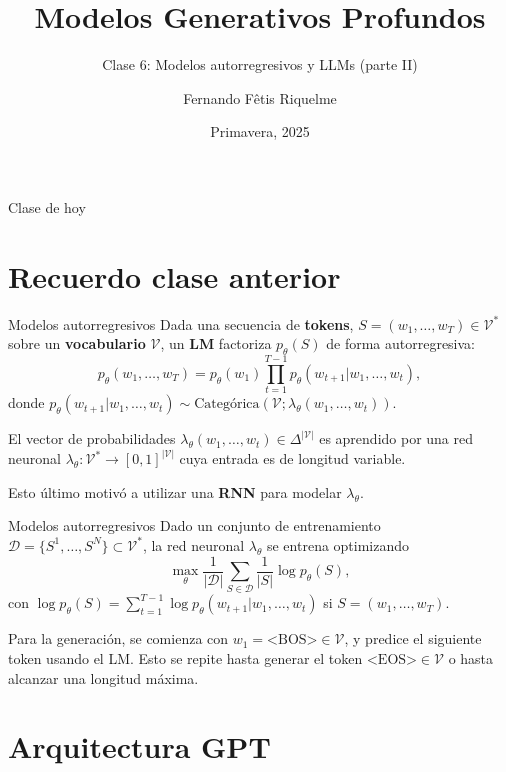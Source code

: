 \documentclass{beamer}
\title{Modelos Generativos Profundos}
\subtitle{Clase 6: Modelos autorregresivos y LLMs (parte II)}
\author{Fernando Fêtis Riquelme}
\institute{
    Facultad de Ciencias Físicas y Matemáticas\\
    Universidad de Chile
}
\date{Primavera, 2025}
\begin{document}
\begin{frame}
    \titlepage
\end{frame}

\begin{frame}{Clase de hoy}
    \tableofcontents
\end{frame}

\section{Recuerdo clase anterior}

\begin{frame}{Modelos autorregresivos}
    Dada una secuencia de \textbf{tokens}, $S=(w_1,\ldots,w_T)\in\mathcal{V}^*$ sobre un \textbf{vocabulario} $\mathcal{V}$, un \textbf{LM} factoriza $p_\theta(S)$ de forma autorregresiva:
    \begin{equation*}
        p_\theta(w_1,\ldots,w_T)=p_\theta(w_1)\prod_{t=1}^{T-1} p_\theta(w_{t+1}|w_1,\ldots,w_t),
    \end{equation*}
    donde $p_\theta(w_{t+1}|w_1,\ldots,w_t)\sim\text{Categórica}\left(\mathcal{V};\lambda_\theta(w_1,\ldots,w_t)\right)$.

    El vector de probabilidades $\lambda_\theta(w_1,\ldots,w_t)\in\Delta^{|\mathcal{V}|}$ es aprendido por una red neuronal $\lambda_\theta:\mathcal{V}^*\to[0,1]^{|\mathcal{V}|}$ cuya entrada es de longitud variable.

    Esto último motivó a utilizar una \textbf{RNN} para modelar $\lambda_\theta$.
\end{frame}

\begin{frame}{Modelos autorregresivos}
    Dado un conjunto de entrenamiento $\mathcal{D}=\{S^1,\ldots,S^N\}\subset\mathcal{V}^*$, la red neuronal $\lambda_\theta$ se entrena optimizando
    \begin{equation*}
        \max_\theta \frac{1}{|\mathcal{D}|}\sum_{S\in\mathcal{D}} \frac{1}{|S|}\log p_\theta(S),
    \end{equation*}
    con $\log p_\theta(S)= \sum_{t=1}^{T-1} \log p_\theta(w_{t+1}|w_1,\ldots,w_t)$ si $S=(w_1,\ldots,w_T)$.

    Para la generación, se comienza con $w_1=\text{<BOS>}\in\mathcal{V}$, y predice el siguiente token usando el LM. Esto se repite hasta generar el token $\text{<EOS>}\in\mathcal{V}$ o hasta alcanzar una longitud máxima.
\end{frame}

\section{Arquitectura GPT}
\end{document}
